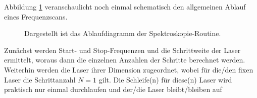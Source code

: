 Abbildung \ref{fig:spektroskopie_ablaufdiagramm} veranschaulicht noch einmal
schematisch den allgemeinen Ablauf eines Frequenzscans.
\begin{figure}[hp]
 	\centering
	\caption[Spektroskopie -
	Software-Ablaufdiagramm]{Dargestellt ist das Ablaufdiagramm der
	Spektroskopie-Routine.}\label{fig:spektroskopie_ablaufdiagramm}
\end{figure}
Zunächst werden Start- und Stop-Frequenzen und die Schrittweite der Laser
ermittelt, woraus dann die einzelnen Anzahlen der Schritte berechnet werden.
Weiterhin werden die Laser ihrer Dimension zugeordnet, wobei für die/den fixen
Laser die Schrittanzahl $N=1$ gilt. Die Schleife(n) für diese(n) Laser wird
praktisch nur einmal durchlaufen und der/die Laser bleibt/bleiben auf
